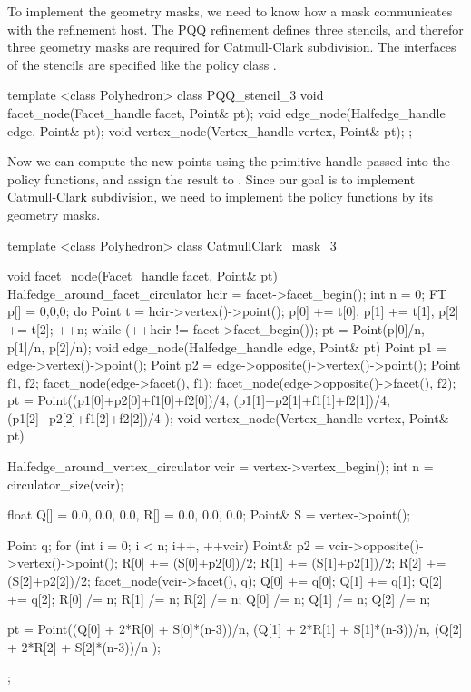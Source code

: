 To implement the geometry masks, we need to know how  
a mask communicates with the refinement host. The PQQ refinement 
defines three stencils, and therefor three geometry masks
are required for Catmull-Clark subdivision.
The interfaces of the stencils are specified like 
the policy class .

\begin{ccExampleCode}
template <class Polyhedron>
class PQQ_stencil_3 {
  void facet_node(Facet_handle facet, Point& pt);
  void edge_node(Halfedge_handle edge, Point& pt);
  void vertex_node(Vertex_handle vertex, Point& pt);
};
\end{ccExampleCode}

Now we can compute the new points using the primitive handle
passed into the policy functions, and assign the result to
. Since our goal is to implement Catmull-Clark 
subdivision, we need to implement the policy functions by its 
geometry masks. 

\begin{ccExampleCode}
template <class Polyhedron>
class CatmullClark_mask_3 {
  void facet_node(Facet_handle facet, Point& pt) {
    Halfedge_around_facet_circulator hcir = facet->facet_begin();
    int n = 0;
    FT p[] = {0,0,0};
    do {
      Point t = hcir->vertex()->point();
      p[0] += t[0], p[1] += t[1], p[2] += t[2]; 
      ++n;
    } while (++hcir != facet->facet_begin());
    pt = Point(p[0]/n, p[1]/n, p[2]/n);
  }
  void edge_node(Halfedge_handle edge, Point& pt) {
    Point p1 = edge->vertex()->point();
    Point p2 = edge->opposite()->vertex()->point();
    Point f1, f2;
    facet_node(edge->facet(), f1);
    facet_node(edge->opposite()->facet(), f2);
    pt = Point((p1[0]+p2[0]+f1[0]+f2[0])/4,
               (p1[1]+p2[1]+f1[1]+f2[1])/4,
               (p1[2]+p2[2]+f1[2]+f2[2])/4 );
  }
  void vertex_node(Vertex_handle vertex, Point& pt) {
    Halfedge_around_vertex_circulator vcir = vertex->vertex_begin();
    int n = circulator_size(vcir);    

    float Q[] = {0.0, 0.0, 0.0}, R[] = {0.0, 0.0, 0.0};
    Point& S = vertex->point();
    
    Point q;
    for (int i = 0; i < n; i++, ++vcir) {
      Point& p2 = vcir->opposite()->vertex()->point();
      R[0] += (S[0]+p2[0])/2;
      R[1] += (S[1]+p2[1])/2;
      R[2] += (S[2]+p2[2])/2;
      facet_node(vcir->facet(), q);
      Q[0] += q[0];      
      Q[1] += q[1];      
      Q[2] += q[2];
    }
    R[0] /= n;    R[1] /= n;    R[2] /= n;
    Q[0] /= n;    Q[1] /= n;    Q[2] /= n;
      
    pt = Point((Q[0] + 2*R[0] + S[0]*(n-3))/n,
               (Q[1] + 2*R[1] + S[1]*(n-3))/n,
               (Q[2] + 2*R[2] + S[2]*(n-3))/n );
  }
};
\end{ccExampleCode}

